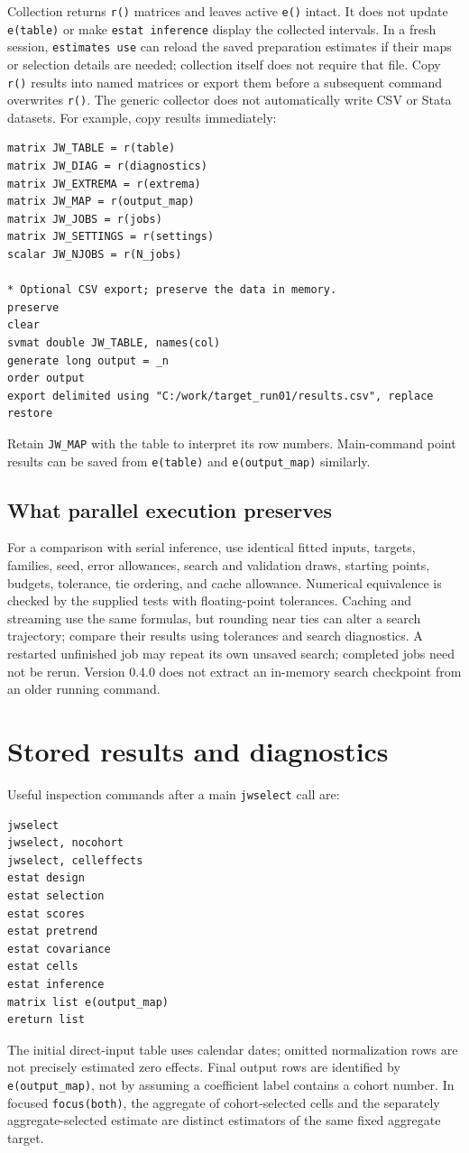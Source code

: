 \documentclass[11pt]{article}
\newcommand{\cmd}[1]{\texttt{#1}}
\begin{document}
Collection returns \cmd{r()} matrices and leaves active \cmd{e()} intact.
It does not update \cmd{e(table)} or make \cmd{estat inference} display the
collected intervals. In a fresh session, \cmd{estimates use} can reload the
saved preparation estimates if their maps or selection details are needed;
collection itself does not require that file. Copy
\cmd{r()} results into named matrices or export them before a subsequent
command overwrites \cmd{r()}. The generic collector does not automatically write CSV or Stata datasets.
For example, copy results immediately:
\begin{lstlisting}
matrix JW_TABLE = r(table)
matrix JW_DIAG = r(diagnostics)
matrix JW_EXTREMA = r(extrema)
matrix JW_MAP = r(output_map)
matrix JW_JOBS = r(jobs)
matrix JW_SETTINGS = r(settings)
scalar JW_NJOBS = r(N_jobs)

* Optional CSV export; preserve the data in memory.
preserve
clear
svmat double JW_TABLE, names(col)
generate long output = _n
order output
export delimited using "C:/work/target_run01/results.csv", replace
restore
\end{lstlisting}
Retain \cmd{JW\_MAP} with the table to interpret its row numbers. Main-command
point results can be saved from \cmd{e(table)} and \cmd{e(output\_map)} similarly.

\subsection{What parallel execution preserves}
For a comparison with serial inference, use identical fitted inputs, targets,
families, seed, error allowances, search and validation draws, starting points,
budgets, tolerance, tie ordering, and cache allowance. Numerical equivalence
is checked by the supplied tests with floating-point tolerances. Caching and
streaming use the same formulas, but rounding near ties can alter a search
trajectory; compare their results using tolerances and search diagnostics. A restarted unfinished job may
repeat its own unsaved search; completed jobs need not be rerun. Version 0.4.0
does not extract an in-memory search checkpoint from an older running command.

\section{Stored results and diagnostics}
Useful inspection commands after a main \cmd{jwselect} call are:
\begin{lstlisting}
jwselect
jwselect, nocohort
jwselect, celleffects
estat design
estat selection
estat scores
estat pretrend
estat covariance
estat cells
estat inference
matrix list e(output_map)
ereturn list
\end{lstlisting}
The initial direct-input table uses calendar dates; omitted normalization rows
are not precisely estimated zero effects. Final output rows are identified by
\cmd{e(output\_map)}, not by assuming a coefficient label contains a cohort
number. In focused \cmd{focus(both)}, the aggregate of cohort-selected cells
and the separately aggregate-selected estimate are distinct estimators of the
same fixed aggregate target.
\end{document}
